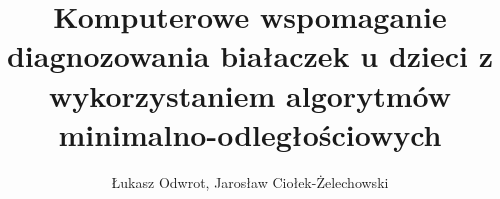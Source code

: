 \documentclass[comsoc]{IEEEtran}
\begin{document}
	\title{Komputerowe wspomaganie diagnozowania białaczek u dzieci z wykorzystaniem algorytmów minimalno-odległościowych}
	\author{Łukasz Odwrot, Jarosław Ciołek-Żelechowski}
	\maketitle

\graphicspath{ {img/} }














\end{document}
